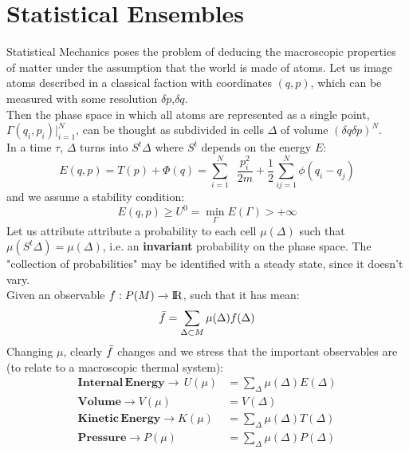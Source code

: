 \documentclass{article}
\newcommand*\kin{\mathop{}\! \frac{p_i^2}{2m} }
\begin{document}
\section{Statistical Ensembles}\label{sec:langapp}
Statistical Mechanics poses the problem of deducing the macroscopic properties of matter under the assumption that the world is made of atoms. Let us image atoms described in a classical faction with coordinates $(q,p)$, which can be measured with some resolution $\delta p$,$\delta q$. \\
Then the phase space in which all atoms are represented as a single point, $\Gamma(q_i,p_i)|_{i=1}^N$, can be thought as subdivided in cells $\Delta$ of volume $(\delta q \delta p)^N$.\\
In a time $\tau$, $\Delta$ turns into $S^t \Delta$ where $S^t$ depends on the energy $E$:
$$E(q,p) = T(p) + \Phi(q) = \sum_{i=1}^N \kin +\frac{1}{2} \sum_{ij=1}^N \phi(q_i-q_j)$$
and we assume a stability condition:
$$E(q,p) \geq U^0 = \min \limits_\Gamma E(\Gamma) > +\infty $$
Let us attribute attribute a probability to each cell $\mu(\Delta)$ such that $\mu(S^t \Delta) =\mu(\Delta)$, i.e. an \textbf{invariant} probability on the phase space. The "collection of probabilities" may be identified with a steady state, since it doesn't vary.\\
Given an observable $f:P(M) \xrightarrow{} \rm I\!R$, such that it has mean:
$$\Bar{f} = \sum_{\Delta \subset M} \mu(\Delta) f(\Delta)$$
Changing $\mu$, clearly $\Bar{f}$ changes and we stress that the important observables are (to relate to a macroscopic thermal system):
\begin{equation*}
    \begin{aligned}
    \mathbf{Internal \, Energy}\xrightarrow{} \,U(\mu) &= \sum_\Delta \mu(\Delta) E(\Delta) \\ 
    \mathbf{Volume  }\xrightarrow{} V(\mu) &= V(\Delta) \\
    \mathbf{Kinetic \,Energy  }\xrightarrow{} K(\mu) &= \sum_\Delta \mu(\Delta) T(\Delta)\\
    \mathbf{Pressure  }\xrightarrow{} P(\mu) &= \sum_\Delta \mu(\Delta) P(\Delta)\\
\end{aligned}
\end{equation*}
    
\end{document}
